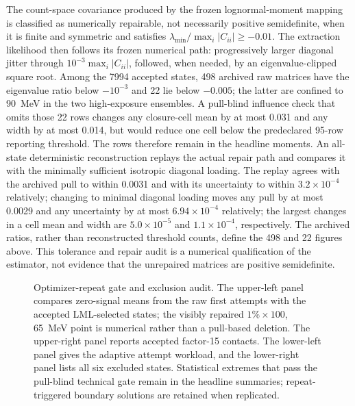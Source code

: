 The count-space covariance produced by the frozen lognormal-moment mapping is
classified as numerically repairable, not necessarily positive semidefinite, when it
is finite and symmetric and satisfies
$\lambda_{\min}/\max_i|C_{ii}|\geq-0.01$.  The extraction likelihood then follows its
frozen numerical path: progressively larger diagonal jitter through
$10^{-3}\max_i|C_{ii}|$, followed, when needed, by an eigenvalue-clipped square root.
Among the 7994 accepted states, 498 archived raw matrices have the eigenvalue ratio
below $-10^{-3}$ and 22 lie below $-0.005$; the latter are confined to 90~MeV in the
two high-exposure ensembles.  A pull-blind influence check that omits those 22 rows
changes any closure-cell mean by at most 0.031 and any width by at most 0.014, but
would reduce one cell below the predeclared 95-row reporting threshold.  The rows
therefore remain in the headline moments.  An all-state deterministic reconstruction
replays the actual repair path and compares it with the minimally sufficient isotropic
diagonal loading.  The replay agrees with the archived pull to within 0.0031 and with
its uncertainty to within $3.2\times10^{-4}$ relatively; changing to minimal diagonal
loading moves any pull by at most 0.0029 and any uncertainty by at most
$6.94\times10^{-4}$ relatively; the largest changes in a cell mean and width are
$5.0\times10^{-5}$ and $1.1\times10^{-4}$, respectively.  The archived ratios, rather than reconstructed
threshold counts, define the 498 and 22 figures above.  This tolerance and repair audit is a
numerical qualification of the estimator, not evidence that the unrepaired matrices
are positive semidefinite.

\begin{figure}[p]
\centering
{}
\caption{Optimizer-repeat gate and exclusion audit.  The upper-left panel compares
zero-signal means from the raw first attempts with the accepted LML-selected states;
the visibly repaired $1\%\times100$, 65~MeV point is numerical rather than a pull-based
deletion.  The upper-right panel reports accepted factor-15 contacts.  The lower-left
panel gives the adaptive attempt workload, and the lower-right panel lists all six
excluded states.  Statistical extremes that pass the pull-blind technical gate remain
in the headline summaries; repeat-triggered boundary solutions are retained when
replicated.}
\label{fig:v4p6-optimizer-gate}
\end{figure}

